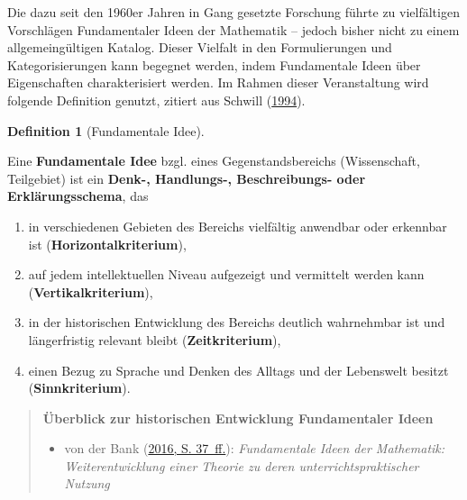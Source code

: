 \documentclass[
]{scrbook}
\providecommand{\tightlist}{%
  \setlength{\itemsep}{0pt}\setlength{\parskip}{0pt}}
\theoremstyle{definition}
\newtheorem{definition}{Definition}[chapter]
\theoremstyle{definition}
\theoremstyle{definition}
\theoremstyle{definition}
\theoremstyle{remark}
\begin{document}
Die dazu seit den 1960er Jahren in Gang gesetzte Forschung führte zu vielfältigen Vorschlägen Fundamentaler Ideen der Mathematik -- jedoch bisher nicht zu einem allgemeingültigen Katalog. Dieser Vielfalt in den Formulierungen und Kategorisierungen kann begegnet werden, indem Fundamentale Ideen über Eigenschaften charakterisiert werden. Im Rahmen dieser Veranstaltung wird folgende Definition genutzt, zitiert aus Schwill (\protect\hyperlink{ref-Schwill:1994}{1994}).

\begin{definition}[Fundamentale Idee]
\protect\hypertarget{def:FundamentaleIdee}{}\label{def:FundamentaleIdee}

Eine \textbf{Fundamentale Idee} bzgl. eines Gegenstandsbereichs (Wissenschaft, Teilgebiet) ist ein \textbf{Denk-, Handlungs-, Beschreibungs- oder Erklärungsschema}, das

\begin{enumerate}
\def\labelenumi{\arabic{enumi}.}
\tightlist
\item
  in verschiedenen Gebieten des Bereichs vielfältig anwendbar oder erkennbar ist (\textbf{Horizontalkriterium}),
\item
  auf jedem intellektuellen Niveau aufgezeigt und vermittelt werden kann (\textbf{Vertikalkriterium}),
\item
  in der historischen Entwicklung des Bereichs deutlich wahrnehmbar ist und längerfristig relevant bleibt (\textbf{Zeitkriterium}),
\item
  einen Bezug zu Sprache und Denken des Alltags und der Lebenswelt besitzt (\textbf{Sinnkriterium}).
\end{enumerate}

\end{definition}

\begin{quote}
\textbf{Überblick zur historischen Entwicklung Fundamentaler Ideen}

\begin{itemize}
\tightlist
\item
  von der Bank (\protect\hyperlink{ref-Bank:2016}{2016, S. 37~ff.}): \emph{Fundamentale Ideen der Mathematik: Weiterentwicklung einer Theorie zu deren unterrichtspraktischer Nutzung}
\end{itemize}
\end{quote}
\end{document}
